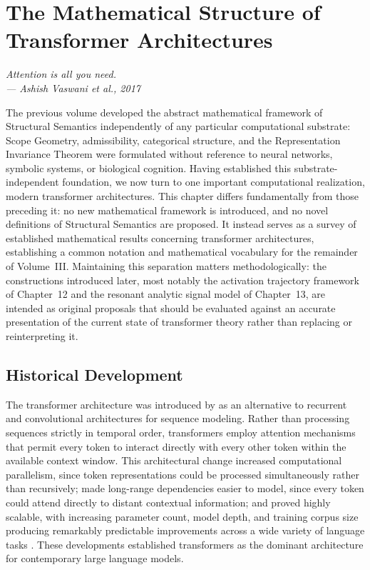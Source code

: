 \documentclass[11pt,twoside,openright]{book}
\numberwithin{equation}{chapter}
\theoremstyle{definition}
\theoremstyle{plain}
\theoremstyle{remark}
\theoremstyle{definition}
\begin{document}
\chapter{The Mathematical Structure of Transformer Architectures}
\label{ch:transformer-structure}

\vspace{1em}
\begin{flushright}\itshape
Attention is all you need.\\
\upshape --- Ashish Vaswani et al., 2017
\end{flushright}
\vspace{1em}

The previous volume developed the abstract mathematical framework of
Structural Semantics independently of any particular computational
substrate: Scope Geometry, admissibility, categorical structure, and the
Representation Invariance Theorem were formulated without reference to
neural networks, symbolic systems, or biological cognition. Having
established this substrate-independent foundation, we now turn to one
important computational realization, modern transformer architectures.
This chapter differs fundamentally from those preceding it: no new
mathematical framework is introduced, and no novel definitions of
Structural Semantics are proposed. It instead serves as a survey of
established mathematical results concerning transformer architectures,
establishing a common notation and mathematical vocabulary for the
remainder of Volume~III. Maintaining this separation matters
methodologically: the constructions introduced later, most notably the
activation trajectory framework of Chapter~12 and the resonant analytic
signal model of Chapter~13, are intended as original proposals that
should be evaluated against an accurate presentation of the current state
of transformer theory rather than replacing or reinterpreting it.

\section{Historical Development}

The transformer architecture was introduced by \citet{Vaswani2017} as an
alternative to recurrent and convolutional architectures for sequence
modeling. Rather than processing sequences strictly in temporal order,
transformers employ attention mechanisms that permit every token to
interact directly with every other token within the available context
window. This architectural change increased computational parallelism,
since token representations could be processed simultaneously rather than
recursively; made long-range dependencies easier to model, since every
token could attend directly to distant contextual information; and proved
highly scalable, with increasing parameter count, model depth, and
training corpus size producing remarkably predictable improvements across
a wide variety of language tasks \cite{Kaplan2020,Hoffmann2022}. These
developments established transformers as the dominant architecture for
contemporary large language models.
\end{document}
